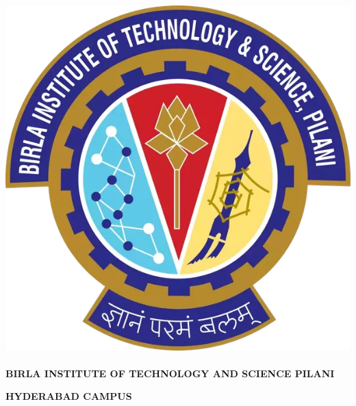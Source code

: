 \documentclass{report}
\begin{document}
\thispagestyle{empty}
\newpage






\paragraph{}
\begin{center}
\includegraphics[scale=0.1]{bits_logo.png} 
\end{center}

\paragraph{}
\begin{center}
\textbf{BIRLA INSTITUTE OF TECHNOLOGY AND SCIENCE PILANI} \\
\end{center}

\begin{center}
\textbf{HYDERABAD CAMPUS} 
\end{center}

\paragraph{}
\begin{center}
 
\end{center}
\end{document}
